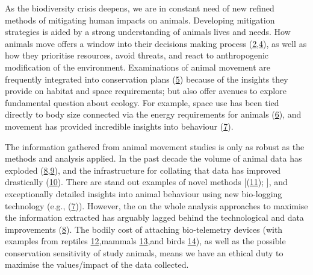 \documentclass[10pt,a4paper]{article}
\begin{document}
As the biodiversity crisis deepens, we are in constant need of new refined methods of mitigating human impacts on animals.
Developing mitigation strategies is aided by a strong understanding of animals lives and needs.
How animals move offers a window into their decisions making process (\protect\hyperlink{ref-Bastille-Rousseau2017}{2},\protect\hyperlink{ref-sridhar_geometry_2021}{4}), as well as how they prioritise resources, avoid threats, and react to anthropogenic modification of the environment.
Examinations of animal movement are frequently integrated into conservation plans (\protect\hyperlink{ref-Fraser2018}{5}) because of the insights they provide on habitat and space requirements; but also offer avenues to explore fundamental question about ecology.
For example, space use has been tied directly to body size connected via the energy requirements for animals (\protect\hyperlink{ref-noonan_effects_2020}{6}), and movement has provided incredible insights into behaviour (\protect\hyperlink{ref-studd_purrfect_2021}{7}).

The information gathered from animal movement studies is only as robust as the methods and analysis applied.
In the past decade the volume of animal data has exploded (\protect\hyperlink{ref-joo_recent_2022}{8},\protect\hyperlink{ref-wild_internet_2022}{9}), and the infrastructure for collating that data has improved drastically (\protect\hyperlink{ref-kays_movebank_2022}{10}).
There are stand out examples of novel methods {[}(\protect\hyperlink{ref-saunders_radio-tracking_2022}{11}); {]}, and exceptionally detailed insights into animal behaviour using new bio-logging technology (e.g., (\protect\hyperlink{ref-studd_purrfect_2021}{7})).
However, the on the whole analysis approaches to maximise the information extracted has arguably lagged behind the technological and data improvements (\protect\hyperlink{ref-joo_recent_2022}{8}).
The bodily cost of attaching bio-telemetry devices (with examples from reptiles \protect\hyperlink{ref-Weatherhead2004}{12},mammals \protect\hyperlink{ref-robstad_impact_2021}{13},and birds \protect\hyperlink{ref-portugal_externally_2022}{14}), as well as the possible conservation sensitivity of study animals, means we have an ethical duty to maximise the values/impact of the data collected.
\end{document}
